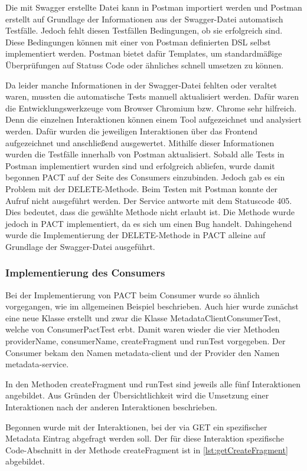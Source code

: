 \documentclass{llncs}
\begin{document}
Die mit Swagger erstellte Datei kann in Postman importiert werden und Postman erstellt auf Grundlage der Informationen aus der Swagger-Datei automatisch Testfälle. Jedoch fehlt diesen Testfällen Bedingungen, ob sie erfolgreich sind. Diese Bedingungen können mit einer von Postman definierten DSL selbst implementiert werden. Postman bietet dafür Templates, um standardmäßige Überprüfungen auf Statuss Code oder ähnliches schnell umsetzen zu können.

Da leider manche Informationen in der Swagger-Datei fehlten oder veraltet waren, mussten die automatische Tests manuell aktualisiert werden. Dafür waren die Entwicklungswerkzeuge vom Browser Chromium bzw. Chrome sehr hilfreich. Denn die einzelnen Interaktionen können einem Tool aufgezeichnet und analysiert werden. Dafür wurden die jeweiligen Interaktionen über das Frontend aufgezeichnet und anschließend ausgewertet. Mithilfe dieser Informationen wurden die Testfälle innerhalb von Postman aktualisiert. Sobald alle Tests in Postman implementiert wurden sind und erfolgreich abliefen, wurde damit begonnen PACT auf der Seite des Consumers einzubinden. Jedoch gab es ein Problem mit der DELETE-Methode. Beim Testen mit Postman konnte der Aufruf nicht ausgeführt werden. Der Service antworte mit dem Statuscode 405. Dies bedeutet, dass die gewählte Methode nicht erlaubt ist. Die Methode wurde jedoch in PACT implementiert, da es sich um einen Bug handelt. Dahingehend wurde die Implementierung der DELETE-Methode in PACT alleine auf Grundlage der Swagger-Datei ausgeführt.

\subsubsection{Implementierung des Consumers}
Bei der Implementierung von PACT beim Consumer wurde so ähnlich vorgegangen, wie im allgemeinen Beispiel beschrieben. Auch hier wurde zunächst eine neue Klasse erstellt und zwar die Klasse MetadataClientConsumerTest, welche von ConsumerPactTest erbt. Damit waren wieder die vier Methoden providerName, consumerName, createFragment und runTest vorgegeben. Der Consumer bekam den Namen metadata-client und der Provider den Namen metadata-service. 

In den Methoden createFragment und runTest sind jeweils alle fünf Interaktionen angebildet. Aus Gründen der Übersichtlichkeit wird die Umsetzung einer Interaktionen nach der anderen Interaktionen beschrieben.

Begonnen wurde mit der Interaktionen, bei der via GET ein spezifischer Metadata Eintrag abgefragt werden soll.
Der für diese Interaktion spezifische Code-Abschnitt in der Methode createFragment ist in \ref{lst:getCreateFragment} abgebildet.
\end{document}
